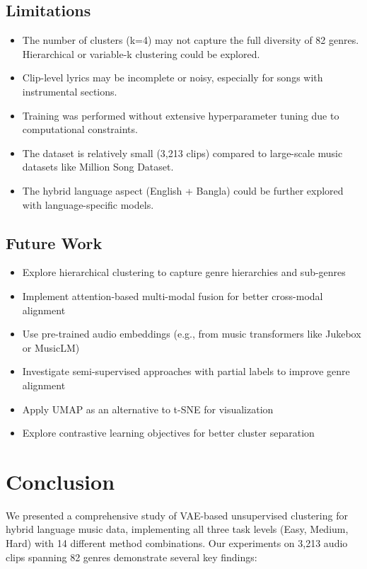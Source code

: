 \documentclass{article}
\begin{document}
\subsection{Limitations}
\begin{itemize}
    \item The number of clusters (k=4) may not capture the full diversity of 82 genres. Hierarchical or variable-k clustering could be explored.
    \item Clip-level lyrics may be incomplete or noisy, especially for songs with instrumental sections.
    \item Training was performed without extensive hyperparameter tuning due to computational constraints.
    \item The dataset is relatively small (3,213 clips) compared to large-scale music datasets like Million Song Dataset.
    \item The hybrid language aspect (English + Bangla) could be further explored with language-specific models.
\end{itemize}

\subsection{Future Work}
\begin{itemize}
    \item Explore hierarchical clustering to capture genre hierarchies and sub-genres
    \item Implement attention-based multi-modal fusion for better cross-modal alignment
    \item Use pre-trained audio embeddings (e.g., from music transformers like Jukebox or MusicLM)
    \item Investigate semi-supervised approaches with partial labels to improve genre alignment
    \item Apply UMAP as an alternative to t-SNE for visualization
    \item Explore contrastive learning objectives for better cluster separation
\end{itemize}

\section{Conclusion}

We presented a comprehensive study of VAE-based unsupervised clustering for hybrid language music data, implementing all three task levels (Easy, Medium, Hard) with 14 different method combinations. Our experiments on 3,213 audio clips spanning 82 genres demonstrate several key findings:
\end{document}
